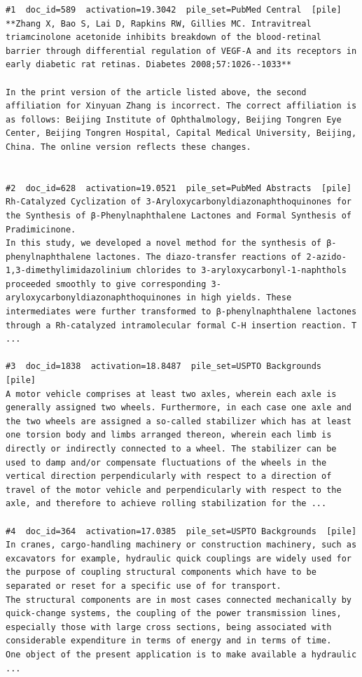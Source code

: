 \begin{verbatim}
#1  doc_id=589  activation=19.3042  pile_set=PubMed Central  [pile]
**Zhang X, Bao S, Lai D, Rapkins RW, Gillies MC. Intravitreal triamcinolone acetonide inhibits breakdown of the blood-retinal barrier through differential regulation of VEGF-A and its receptors in early diabetic rat retinas. Diabetes 2008;57:1026--1033**

In the print version of the article listed above, the second affiliation for Xinyuan Zhang is incorrect. The correct affiliation is as follows: Beijing Institute of Ophthalmology, Beijing Tongren Eye Center, Beijing Tongren Hospital, Capital Medical University, Beijing, China. The online version reflects these changes.


#2  doc_id=628  activation=19.0521  pile_set=PubMed Abstracts  [pile]
Rh-Catalyzed Cyclization of 3-Aryloxycarbonyldiazonaphthoquinones for the Synthesis of β-Phenylnaphthalene Lactones and Formal Synthesis of Pradimicinone.
In this study, we developed a novel method for the synthesis of β-phenylnaphthalene lactones. The diazo-transfer reactions of 2-azido-1,3-dimethylimidazolinium chlorides to 3-aryloxycarbonyl-1-naphthols proceeded smoothly to give corresponding 3-aryloxycarbonyldiazonaphthoquinones in high yields. These intermediates were further transformed to β-phenylnaphthalene lactones through a Rh-catalyzed intramolecular formal C-H insertion reaction. T ...

#3  doc_id=1838  activation=18.8487  pile_set=USPTO Backgrounds  [pile]
A motor vehicle comprises at least two axles, wherein each axle is generally assigned two wheels. Furthermore, in each case one axle and the two wheels are assigned a so-called stabilizer which has at least one torsion body and limbs arranged thereon, wherein each limb is directly or indirectly connected to a wheel. The stabilizer can be used to damp and/or compensate fluctuations of the wheels in the vertical direction perpendicularly with respect to a direction of travel of the motor vehicle and perpendicularly with respect to the axle, and therefore to achieve rolling stabilization for the ...

#4  doc_id=364  activation=17.0385  pile_set=USPTO Backgrounds  [pile]
In cranes, cargo-handling machinery or construction machinery, such as excavators for example, hydraulic quick couplings are widely used for the purpose of coupling structural components which have to be separated or reset for a specific use of for transport.
The structural components are in most cases connected mechanically by quick-change systems, the coupling of the power transmission lines, especially those with large cross sections, being associated with considerable expenditure in terms of energy and in terms of time.
One object of the present application is to make available a hydraulic ...


\end{verbatim}
